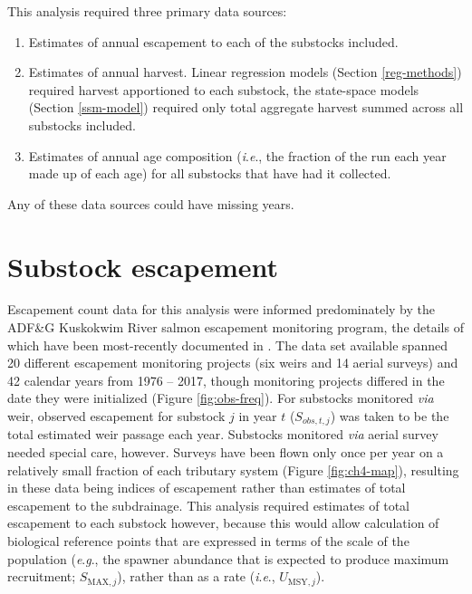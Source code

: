 \documentclass[12pt,]{book}
\theoremstyle{definition}
\theoremstyle{definition}
\theoremstyle{definition}
\theoremstyle{remark}
\begin{document}
\noindent
This analysis required three primary data sources:

\begin{enumerate}
\def\labelenumi{(\arabic{enumi})}
\item
  Estimates of annual escapement to each of the substocks included.
\item
  Estimates of annual harvest. Linear regression models (Section
  \ref{reg-methods}) required harvest apportioned to each substock, the
  state-space models (Section \ref{ssm-model}) required only total
  aggregate harvest summed across all substocks included.
\item
  Estimates of annual age composition (\emph{i}.\emph{e}., the fraction
  of the run each year made up of each age) for all substocks that have
  had it collected.
\end{enumerate}

\noindent
Any of these data sources could have missing years.

\section{Substock escapement}\label{air-expansion}

\noindent
Escapement count data for this analysis were informed predominately by
the ADF\&G Kuskokwim River salmon escapement monitoring program, the
details of which have been most-recently documented in
\citet{head-smith-2018}. The data set available spanned 20 different
escapement monitoring projects (six weirs and 14 aerial surveys) and 42
calendar years from 1976 -- 2017, though monitoring projects differed in
the date they were initialized (Figure \ref{fig:obs-freq}). For
substocks monitored \emph{via} weir, observed escapement for substock
\(j\) in year \(t\) (\(S_{obs,t,j}\)) was taken to be the total
estimated weir passage each year. Substocks monitored \emph{via} aerial
survey needed special care, however. Surveys have been flown only once
per year on a relatively small fraction of each tributary system (Figure
\ref{fig:ch4-map}), resulting in these data being indices of escapement
rather than estimates of total escapement to the subdrainage. This
analysis required estimates of total escapement to each substock
however, because this would allow calculation of biological reference
points that are expressed in terms of the scale of the population
(\emph{e}.\emph{g}., the spawner abundance that is expected to produce
maximum recruitment; \(S_{\text{MAX},j}\)), rather than as a rate
(\emph{i}.\emph{e}., \(U_{\text{MSY},j}\)).
\end{document}
